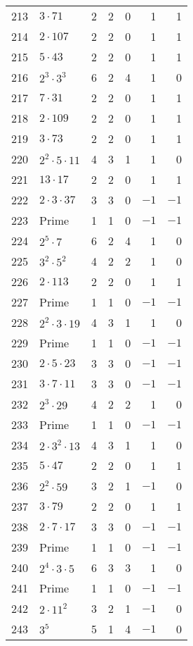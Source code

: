 \documentclass[12pt]{article}
\begin{document}
\begin{tabular}{|r|l|r|r|r|r|r|}
213 & $3 \cdot 71$ & 2 & 2 & 0 & 1 & 1 \\
214 & $2 \cdot 107$ & 2 & 2 & 0 & 1 & 1 \\
215 & $5 \cdot 43$ & 2 & 2 & 0 & 1 & 1 \\
216 & $2^3 \cdot 3^3$ & 6 & 2 & 4 & 1 & 0 \\
217 & $7 \cdot 31$ & 2 & 2 & 0 & 1 & 1 \\
218 & $2 \cdot 109$ & 2 & 2 & 0 & 1 & 1 \\
219 & $3 \cdot 73$ & 2 & 2 & 0 & 1 & 1 \\
220 & $2^2 \cdot 5 \cdot 11$ & 4 & 3 & 1 & 1 & 0 \\
221 & $13 \cdot 17$ & 2 & 2 & 0 & 1 & 1 \\
222 & $2 \cdot 3 \cdot 37$ & 3 & 3 & 0 & $-1$ & $-1$ \\
223 & Prime & 1 & 1 & 0 & $-1$ & $-1$ \\
224 & $2^5 \cdot 7$ & 6 & 2 & 4 & 1 & 0 \\
225 & $3^2 \cdot 5^2$ & 4 & 2 & 2 & 1 & 0 \\
226 & $2 \cdot 113$ & 2 & 2 & 0 & 1 & 1 \\
227 & Prime & 1 & 1 & 0 & $-1$ & $-1$ \\
228 & $2^2 \cdot 3 \cdot 19$ & 4 & 3 & 1 & 1 & 0 \\
229 & Prime & 1 & 1 & 0 & $-1$ & $-1$ \\
230 & $2 \cdot 5 \cdot 23$ & 3 & 3 & 0 & $-1$ & $-1$ \\
231 & $3 \cdot 7 \cdot 11$ & 3 & 3 & 0 & $-1$ & $-1$ \\
232 & $2^3 \cdot 29$ & 4 & 2 & 2 & 1 & 0 \\
233 & Prime & 1 & 1 & 0 & $-1$ & $-1$ \\
234 & $2 \cdot 3^2 \cdot 13$ & 4 & 3 & 1 & 1 & 0 \\
235 & $5 \cdot 47$ & 2 & 2 & 0 & 1 & 1 \\
236 & $2^2 \cdot 59$ & 3 & 2 & 1 & $-1$ & 0 \\
237 & $3 \cdot 79$ & 2 & 2 & 0 & 1 & 1 \\
238 & $2 \cdot 7 \cdot 17$ & 3 & 3 & 0 & $-1$ & $-1$ \\
239 & Prime & 1 & 1 & 0 & $-1$ & $-1$ \\
240 & $2^4 \cdot 3 \cdot 5$ & 6 & 3 & 3 & 1 & 0 \\
241 & Prime & 1 & 1 & 0 & $-1$ & $-1$ \\
242 & $2 \cdot 11^2$ & 3 & 2 & 1 & $-1$ & 0 \\
243 & $3^5$ & 5 & 1 & 4 & $-1$ & 0 \\

\end{tabular}
\end{document}
